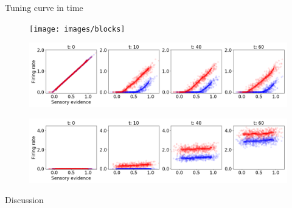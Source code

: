 \documentclass[14pt]{beamer}
\begin{document}
\begin{frame}{Tuning curve in time}

  \begin{figure}[htb]
  \texttt{[image: images/blocks]}
  \end{figure}

  \begin{figure}[htb]
  \includegraphics[width=\textwidth]{images/rtask/tuning-35}
  \end{figure}
  \vspace{-0.5cm}
  \begin{figure}[htb]
  \includegraphics[width=\textwidth]{images/rtask/tuning-44}
  \end{figure}

\end{frame}


\begin{frame}{Discussion}

\end{frame}

\end{document}
